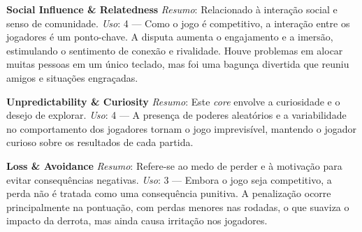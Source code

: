 \vspace{0.5em}
\textbf{Social Influence \& Relatedness}
\textit{Resumo}: Relacionado à interação social e senso de comunidade.
\textit{Uso}: 4 — Como o jogo é competitivo, a interação entre os jogadores é um ponto-chave. A disputa aumenta o engajamento e a imersão, estimulando o sentimento de conexão e rivalidade. Houve problemas em alocar muitas pessoas em um único teclado, mas foi uma bagunça divertida que reuniu amigos e situações engraçadas.

\vspace{0.5em}
\textbf{Unpredictability \& Curiosity}
\textit{Resumo}: Este \textit{core} envolve a curiosidade e o desejo de explorar.
\textit{Uso}: 4 — A presença de poderes aleatórios e a variabilidade no comportamento dos jogadores tornam o jogo imprevisível, mantendo o jogador curioso sobre os resultados de cada partida.

\vspace{0.5em}
\textbf{Loss \& Avoidance}
\textit{Resumo}: Refere-se ao medo de perder e à motivação para evitar consequências negativas.
\textit{Uso}: 3 — Embora o jogo seja competitivo, a perda não é tratada como uma consequência punitiva. A penalização ocorre principalmente na pontuação, com perdas menores nas rodadas, o que suaviza o impacto da derrota, mas ainda causa irritação nos jogadores.
